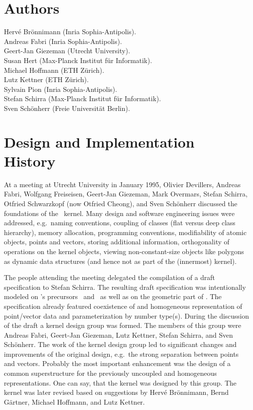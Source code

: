 \section*{Authors}

Herv\'e Br\"onnimann ({\sc Inria} Sophia-Antipolis). \\
Andreas Fabri ({\sc Inria} Sophia-Antipolis).\\
Geert-Jan Giezeman (Utrecht University).\\
Susan Hert (Max-Planck Institut f\"ur Informatik).\\
Michael Hoffmann (ETH Z\"urich).\\
Lutz Kettner (ETH Z\"urich).\\
Sylvain Pion ({\sc Inria} Sophia-Antipolis). \\
Stefan Schirra (Max-Planck Institut f\"ur Informatik).\\
Sven Sch\"onherr (Freie Universit{\"a}t Berlin).

\section*{Design and Implementation History}

At a meeting at Utrecht University in January 1995,
Olivier Devillers, Andreas Fabri, Wolfgang Freiseisen,
Geert-Jan Giezeman, Mark Overmars, Stefan Schirra, Otfried Schwarzkopf
(now Otfried Cheong), and Sven Sch\"onherr
discussed the foundations of the \cgal\ kernel.
Many design and software engineering issues were addressed, 
e.g.\ naming conventions, coupling of classes 
(flat versus deep class hierarchy), 
memory allocation, programming conventions, modifiability of 
atomic objects, points and vectors, storing additional information, 
orthogonality of operations on the kernel objects,
viewing non-constant-size objects like polygons as 
dynamic data structures (and hence not as part of the (innermost) kernel).

The people attending the meeting delegated the compilation of 
a draft specification to Stefan Schirra.
The resulting draft specification was intentionally modeled on \cgal's 
precursors \protocgal\ and \plageo\ as well as on the geometric part of \leda.
The specification already featured coexistence of 
 and 
homogeneous representation of point/vector data and parameterization 
by number type(s).
During the discussion of the draft a kernel design group was formed. 
The members of this group were Andreas Fabri, Geert-Jan Giezeman,
Lutz Kettner, Stefan Schirra, and Sven Sch\"onherr.
The work of the kernel design group led to significant changes and
improvements of the original design, e.g.\ the strong separation between
points and vectors. Probably the most important enhancement was the design 
of a common superstructure for the previously uncoupled 
 and
homogeneous representations. One can say, that the kernel was designed
by this group.
The kernel was later revised based on suggestions by Herv\'e Br\"onnimann,
Bernd G\"artner, Michael Hoffmann, and Lutz Kettner.

